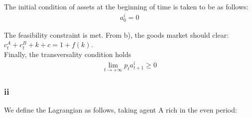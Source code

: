 \documentclass{article}
\begin{document}
The initial condition of assets at the beginning of time is taken to be as follows:
\begin{gather*}
    a^i_{0} = 0
\end{gather*}

The feasibility constraint is met. From b), the goods market should clear: $c_t^A+c_t^B+k+c=1+f(k)$. \\
Finally, the transversality condition holds
\begin{gather*}
    \lim_{t\rightarrow +\infty} p_ta_{t+1}^i \geq 0
\end{gather*}



\subsubsection{ii}
We define the Lagrangian as follows, taking agent A rich in the even period:
\end{document}
